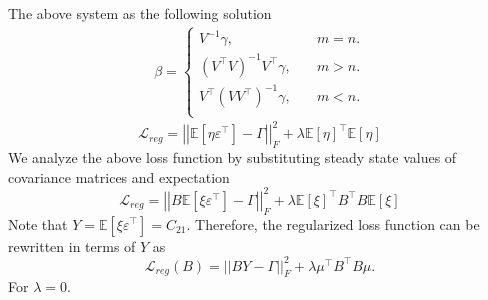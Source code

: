 \documentclass[11pt]{article}
\begin{document}
The above system as the following solution
\begin{align}
    \beta = \begin{cases} V^{-1} \gamma,                   & \quad m = n. \\
              (V^{\top}V)^{-1} V^{\top}\gamma, & \quad m > n. \\
              V^{\top}(VV^{\top})^{-1} \gamma, & \quad m < n. \\
            \end{cases}
\end{align}
\begin{equation}
    \mathcal{L}_{reg} = \left|\left|\mathbb{E}[{\eta \varepsilon^{\top}}] - \Gamma \right|\right|_F^2 + \lambda \mathbb{E}[\eta]^{\top}\mathbb{E}[\eta]
\end{equation}
We analyze the above loss function by substituting steady state values of covariance matrices and expectation
\begin{equation}
    \mathcal{L}_{reg} = \left|\left|B\mathbb{E}[{\xi \varepsilon^{\top}}] - \Gamma \right|\right|_F^2 + \lambda \mathbb{E}[\xi]^{\top}B^{\top}B\mathbb{E}[\xi]
\end{equation}
Note that $Y = \mathbb{E}[\xi \varepsilon^{\top}] = C_{21}$.
Therefore, the regularized loss function can be rewritten in terms of $Y$ as
\begin{equation}
    \mathcal{L}_{reg}(B) = \left|\left|BY - \Gamma \right|\right|_F^2 + \lambda \mu^{\top}B^{\top}B\mu.
\end{equation}
For $\lambda = 0$.

\end{document}
